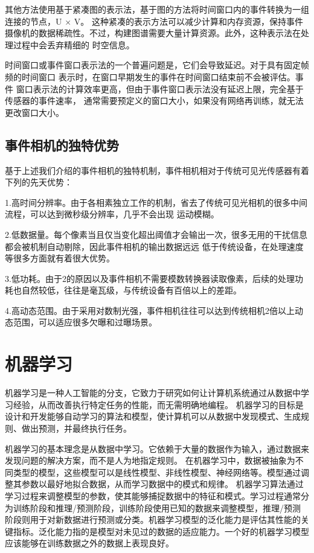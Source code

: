 其他方法使用基于紧凑图的表示法，基于图的方法将时间窗口内的事件转换为一组连接的节点，U × V。
这种紧凑的表示方法可以减少计算和内存资源，保持事件摄像机的数据稀疏性。不过，构建图谱需要大量计算资源。此外，这种表示法在处理过程中会丢弃精细的
时空信息。

时间窗口或事件窗口表示法的一个普遍问题是，它们会导致延迟。对于具有固定帧频的时间窗口
表示时，在窗口早期发生的事件在时间窗口结束前不会被评估。事件
窗口表示法的计算效率更高，但由于事件窗口表示法没有延迟上限，完全基于传感器的事件速率，
通常需要预定义的窗口大小，如果没有网络再训练，就无法更改窗口大小。



\subsection{事件相机的独特优势}
基于上述我们介绍的事件相机的独特机制，事件相机相对于传统可见光传感器有着下列的先天优势：

1.高时间分辨率。由于各相素独立工作的机制，省去了传统可见光相机的很多中间流程，可以达到微秒级分辨率，几乎不会出现
运动模糊。

2.低数据量。每个像素当且仅当变化超出阈值才会输出一次，很多无用的干扰信息都会被机制自动剔除，因此事件相机的输出数据远远
低于传统设备，在处理速度等很多方面就有着很大优势。

3.低功耗。由于2的原因以及事件相机不需要模数转换器读取像素，后续的处理功耗也自然较低，往往是毫瓦级，与传统设备有百倍以上的差距。

4.高动态范围。由于采用对数制光强，事件相机往往可以达到传统相机2倍以上动态范围，可以适应很多欠曝和过曝场景。

\section{机器学习}
机器学习是一种人工智能的分支，它致力于研究如何让计算机系统通过从数据中学习经验，从而改善执行特定任务的性能，而无需明确地编程。
机器学习的目标是设计和开发能够自动学习的算法和模型，使计算机可以从数据中发现模式、生成规则、做出预测，并最终执行任务。

机器学习的基本理念是从数据中学习。它依赖于大量的数据作为输入，通过数据来发现问题的解决方案，而不是人为地指定规则。
在机器学习中，数据被抽象为不同类型的模型，这些模型可以是线性模型、非线性模型、神经网络等。模型通过调整其参数以最好地拟合数据，从而学习数据中的模式和规律。
机器学习算法通过学习过程来调整模型的参数，使其能够捕捉数据中的特征和模式。学习过程通常分为训练阶段和推理/预测阶段，训练阶段使用已知的数据来调整模型，推理/预测
阶段则用于对新数据进行预测或分类。机器学习模型的泛化能力是评估其性能的关键指标。泛化能力指的是模型对未见过的数据的适应能力。一个好的机器学习模型应该能够在训练数据之外的数据上表现良好。

